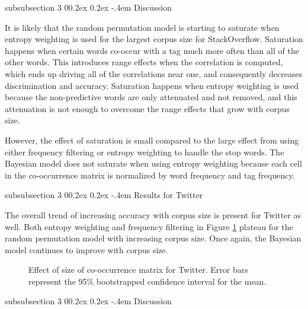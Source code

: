 \documentclass[man,floatsintext,donotrepeattitle]{apa6}
\makeatletter
\renewcommand{\subsubsection}{%
  \@startsection
  {subsubsection}%
  {3}%
  {\parindent}%
  {0\baselineskip \@plus 0.2ex \@minus 0.2ex}%
  {-.4em}%
  {\normalfont\normalsize\bfseries\addperi}}
\makeatother
\begin{document}
\subsubsection{Discussion}

It is likely that the random permutation model is starting to saturate when entropy weighting is used for the largest corpus size for StackOverflow.
Saturation happens when certain words co-occur with a tag much more often than all of the other words.
This introduces range effects when the correlation is computed, which ends up driving all of the correlations near one, and consequently decreases discrimination and accuracy.
Saturation happens when entropy weighting is used because the non-predictive words are only attenuated and not removed, and this attenuation is not enough to overcome the range effects that grow with corpus size.

However, the effect of saturation is small compared to the large effect from using either frequency filtering or entropy weighting to handle the stop words.
The Bayesian model does not saturate when using entropy weighting because each cell in the co-occurrence matrix is normalized by word frequency and tag frequency.

\subsubsection{Results for Twitter}

The overall trend of increasing accuracy with corpus size is present for Twitter as well.
Both entropy weighting and frequency filtering in Figure \ref{figContextDocumentSizeT} plateau for the random permutation model with increasing corpus size.
Once again, the Bayesian model continues to improve with corpus size.

\begin{figure}[!htbp]
  \caption{
    Effect of size of co-occurrence matrix for Twitter.
    Error bars represent the 95\% bootstrapped confidence interval for the mean.
  }
  \label{figContextDocumentSizeT}
\end{figure}

\subsubsection{Discussion}
\end{document}
